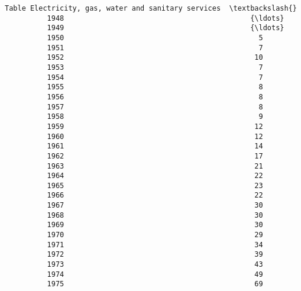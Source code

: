 \documentclass[11pt]{article}
\begin{document}
\begin{Verbatim}[commandchars=\\\{\}]
          Table Electricity, gas, water and sanitary services  \textbackslash{}
          1948                                            {\ldots}   
          1949                                            {\ldots}   
          1950                                              5   
          1951                                              7   
          1952                                             10   
          1953                                              7   
          1954                                              7   
          1955                                              8   
          1956                                              8   
          1957                                              8   
          1958                                              9   
          1959                                             12   
          1960                                             12   
          1961                                             14   
          1962                                             17   
          1963                                             21   
          1964                                             22   
          1965                                             23   
          1966                                             22   
          1967                                             30   
          1968                                             30   
          1969                                             30   
          1970                                             29   
          1971                                             34   
          1972                                             39   
          1973                                             43   
          1974                                             49   
          1975                                             69   
          

\end{Verbatim}
\end{document}
